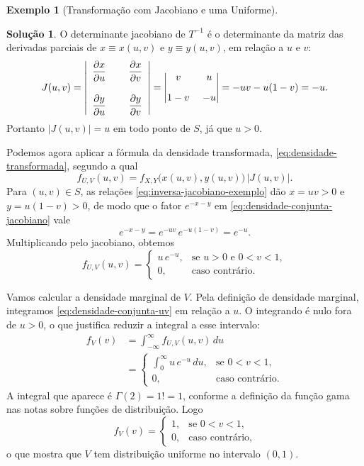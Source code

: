 \documentclass[12pt,portuguese]{article}
\theoremstyle{definition}
\newtheorem{example}[example]{Exemplo}
\theoremstyle{plainexercise}
\theoremstyle{starredexercise}
\theoremstyle{definition}
\newtheorem*{solution}{Solução}
\begin{document}
\begin{example}[Transformação com Jacobiano e uma Uniforme]
\begin{solution}
\medskip
O determinante jacobiano de $T^{-1}$ é o determinante da matriz das
derivadas parciais de $x\equiv x(u,v)$ e $y\equiv y(u,v)$, em relação a $u$ e $v$:
\[
J(u,v)
=
\left|
\begin{array}{>{\displaystyle}c@{\hspace{0.8cm}}>{\displaystyle}c}
\frac{\partial x}{\partial u} & \frac{\partial x}{\partial v} 
\\[0.6cm]
\frac{\partial y}{\partial u} & \frac{\partial y}{\partial v}
\end{array}
\right|
=
\begin{vmatrix}
v\ & u 
\\[0.3cm]
1-v\ & -u
\end{vmatrix}
= -uv - u(1-v) = -u.
\]
Portanto $|J(u,v)| = u$ em todo ponto de $S$, já que $u > 0$.

\medskip
Podemos agora aplicar a fórmula da densidade transformada,
\eqref{eq:densidade-transformada}, segundo a qual
\[
f_{U,V}(u,v)
= f_{X,Y}\bigl(x(u,v), y(u,v)\bigr)\,\bigl|J(u,v)\bigr|.
\]
Para $(u,v) \in S$, as relações \eqref{eq:inversa-jacobiano-exemplo}
dão $x = uv > 0$ e $y = u(1-v) > 0$, de modo que o fator
$e^{-x-y}$ em \eqref{eq:densidade-conjunta-jacobiano} vale
\[
e^{-x-y} = e^{-uv}\,e^{-u(1-v)} = e^{-u}.
\]
Multiplicando pelo jacobiano, obtemos
\begin{equation}\label{eq:densidade-conjunta-uv}
f_{U,V}(u,v) =
\begin{cases}
u\,e^{-u}, & \text{se } u > 0 \text{ e } 0 < v < 1, \\[0.2cm]
0, & \text{caso contrário}.
\end{cases}
\end{equation}

\medskip
Vamos calcular a densidade marginal de $V$. Pela definição de densidade
marginal, integramos \eqref{eq:densidade-conjunta-uv} em relação a $u$.
O integrando é nulo fora de $u > 0$, o que justifica reduzir a integral
a esse intervalo:
\begin{align*}
f_V(v)
&= \int_{-\infty}^{\infty} f_{U,V}(u,v)\,du
\\[0.3cm]
&= \begin{cases}
\displaystyle\int_0^{\infty} u\,e^{-u}\,du, & \text{se } 0 < v < 1, \\[0.4cm]
0, & \text{caso contrário}.
\end{cases}
\end{align*}
A integral que aparece é $\Gamma(2) = 1! = 1$, conforme a definição da
função gama nas notas sobre funções de distribuição. Logo
\begin{equation}\label{eq:marginal-v-uniforme}
f_V(v) =
\begin{cases}
1, & \text{se } 0 < v < 1, \\[0.2cm]
0, & \text{caso contrário},
\end{cases}
\end{equation}
o que mostra que $V$ tem distribuição uniforme no intervalo $(0,1)$.


\end{solution}
\end{example}
\end{document}
